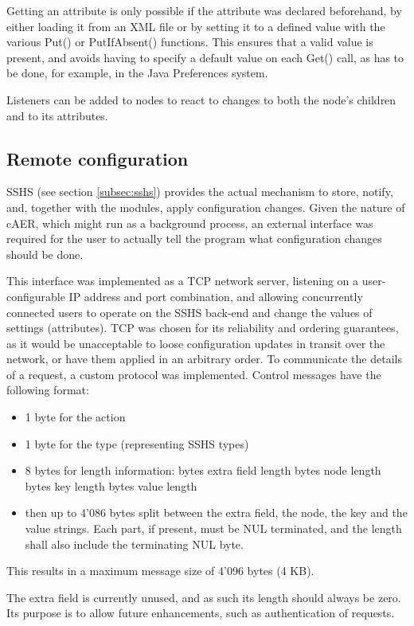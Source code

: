 \documentclass[a4paper,12pt]{report}
\begin{document}
Getting an attribute is only possible if the attribute was declared beforehand, by either loading it from an XML file or by setting it to a defined value with the various Put() or PutIfAbsent() functions. This ensures that a valid value is present, and avoids having to specify a default value on each Get() call, as has to be done, for example, in the Java Preferences system.

Listeners can be added to nodes to react to changes to both the node's children and to its attributes.

\subsection{Remote configuration} \label{subsec:remote_configuration}

SSHS (see section \ref{subsec:sshs}) provides the actual mechanism to store, notify, and, together with the modules, apply configuration changes. Given the nature of cAER, which might run as a background process, an external interface was required for the user to actually tell the program what configuration changes should be done.

This interface was implemented as a TCP network server, listening on a user-configurable IP address and port combination, and allowing concurrently connected users to operate on the SSHS back-end and change the values of settings (attributes).
TCP was chosen for its reliability and ordering guarantees, as it would be unacceptable to loose configuration updates in transit over the network, or have them applied in an arbitrary order.
\clearpage
To communicate the details of a request, a custom protocol was implemented.
Control messages have the following format:
\begin{itemize}
\item 1 byte for the action
\item 1 byte for the type (representing SSHS types)
\item 8 bytes for length information:
 bytes extra field length
 bytes node length
 bytes key length
 bytes value length
\item then up to 4'086 bytes split between the extra field, the node, the key and the value strings. Each part, if present, must be NUL terminated, and the length shall also include the terminating NUL byte.
\end{itemize}
This results in a maximum message size of 4'096 bytes (4 KB).

The extra field is currently unused, and as such its length should always be zero. Its purpose is to allow future enhancements, such as authentication of requests.
\end{document}
